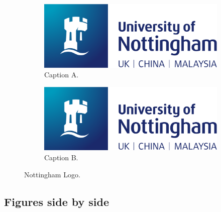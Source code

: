 \begin{figure}[h]
    \centering
    \begin{subfigure}[h]{0.45\textwidth}
        \centering
        \includegraphics[width=\textwidth]{images/nottingham-logo.png}
        \caption{Caption A.}
        \label{fig:captiona}
    \end{subfigure}
    \hfill
    \begin{subfigure}[h]{0.45\textwidth}
        \centering
        \includegraphics[width=\textwidth]{images/nottingham-logo.png}
        \caption{Caption B.}
        \label{fig:captionb}
    \end{subfigure}
    \caption{Nottingham Logo.}
\end{figure}

\subsection{Figures side by side}

